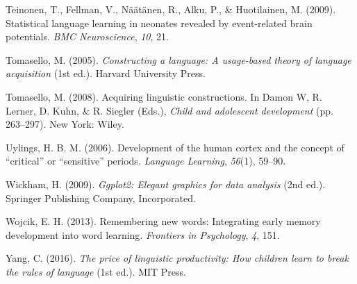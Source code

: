 \documentclass[man,mask,floatsintext]{apa6}
\begin{document}
\hypertarget{ref-teinonen2009statistical}{}
Teinonen, T., Fellman, V., Näätänen, R., Alku, P., \& Huotilainen, M.
(2009). Statistical language learning in neonates revealed by
event-related brain potentials. \emph{BMC Neuroscience}, \emph{10}, 21.

\hypertarget{ref-tomasello2003constructing}{}
Tomasello, M. (2005). \emph{Constructing a language: A usage-based
theory of language acquisition} (1st ed.). Harvard University Press.

\hypertarget{ref-tomasello2006acquiring}{}
Tomasello, M. (2008). Acquiring linguistic constructions. In Damon W, R.
Lerner, D. Kuhn, \& R. Siegler (Eds.), \emph{Child and adolescent
development} (pp. 263--297). New York: Wiley.

\hypertarget{ref-uylings2006development}{}
Uylings, H. B. M. (2006). Development of the human cortex and the
concept of ``critical'' or ``sensitive'' periods. \emph{Language
Learning}, \emph{56}(1), 59--90.

\hypertarget{ref-ggplot2}{}
Wickham, H. (2009). \emph{Ggplot2: Elegant graphics for data analysis}
(2nd ed.). Springer Publishing Company, Incorporated.

\hypertarget{ref-wojcik2013remembering}{}
Wojcik, E. H. (2013). Remembering new words: Integrating early memory
development into word learning. \emph{Frontiers in Psychology},
\emph{4}, 151.

\hypertarget{ref-yang2016price}{}
Yang, C. (2016). \emph{The price of linguistic productivity: How
children learn to break the rules of language} (1st ed.). MIT Press.

\endgroup
\end{document}
